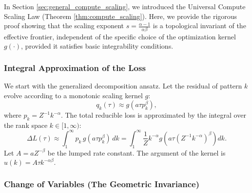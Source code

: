 \documentclass{article}
\theoremstyle{plain}
\theoremstyle{definition}
\theoremstyle{remark}
\begin{document}
In Section \ref{sec:general_compute_scaling}, we introduced the Universal Compute Scaling Law (Theorem \ref{thm:compute_scaling}). Here, we provide the rigorous proof showing that the scaling exponent $s = \frac{\alpha-1}{\alpha\beta}$ is a topological invariant of the effective frontier, independent of the specific choice of the optimization kernel $g(\cdot)$, provided it satisfies basic integrability conditions.

\subsubsection{Integral Approximation of the Loss}

We start with the generalized decomposition ansatz. Let the residual of pattern $k$ evolve according to a monotonic scaling kernel $g$:
\begin{equation*}
    q_k(\tau) \approx g\left( a \tau p_k^\beta \right),
\end{equation*}
where $p_k = Z^{-1} k^{-\alpha}$. The total reducible loss is approximated by the integral over the rank space $k \in [1, \infty)$:
\begin{equation*}
    \Delta L(\tau) \approx \int_{1}^{\infty} p_k \, g(a \tau p_k^\beta) \, dk = \int_{1}^{\infty} \frac{1}{Z} k^{-\alpha} g\left( a \tau (Z^{-1} k^{-\alpha})^\beta \right) dk.
\end{equation*}
Let $A = a Z^{-\beta}$ be the lumped rate constant. The argument of the kernel is $u(k) = A \tau k^{-\alpha\beta}$.

\subsubsection{Change of Variables (The Geometric Invariance)}
\end{document}

